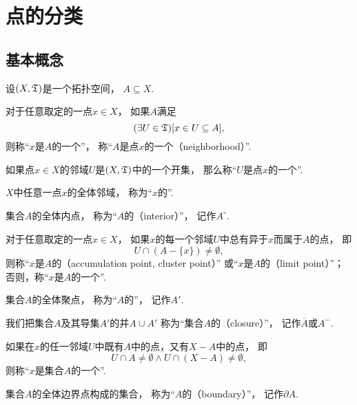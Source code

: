 \section{点的分类}
\subsection{基本概念}
\begin{definition}\label{definition:拓扑学.点的分类}
设\((X,\mathfrak T)\)是一个拓扑空间，
\(A \subseteq X\).

对于任意取定的一点\(x \in X\)，
如果\(A\)满足\[
	(\exists U\in\mathfrak T)
	[x \in U \subseteq A],
\]
则称“\(x\)是\(A\)的一个”，
称“\(A\)是点\(x\)的一个（neighborhood）”.

如果点\(x \in X\)的邻域\(U\)是\((X,\mathfrak T)\)中的一个开集，
那么称“\(U\)是点\(x\)的一个”.

\(X\)中任意一点\(x\)的全体邻域，
称为“\(x\)的”.

集合\(A\)的全体内点，
称为“\(A\)的（interior）”，
记作\(A^\circ\).

对于任意取定的一点\(x \in X\)，
如果\(x\)的每一个邻域\(U\)中总有异于\(x\)而属于\(A\)的点，
即\[
	U \cap (A - \{x\}) \neq \emptyset,
\]
则称“\(x\)是\(A\)的（accumulation point, cluster point）”
或“\(x\)是\(A\)的（limit point）”；
否则，称“\(x\)是\(A\)的一个”.

集合\(A\)的全体聚点，
称为“\(A\)的”，
记作\(A'\).

我们把集合\(A\)及其导集\(A'\)的并\(A \cup A'\)
称为“集合\(A\)的（closure）”，
记作\(\overline{A}\)或\(A^-\).

如果在\(x\)的任一邻域\(U\)中既有\(A\)中的点，又有\(X - A\)中的点，
即\[
	U \cap A \neq \emptyset
	\land
	U \cap (X-A) \neq \emptyset,
\]
则称“\(x\)是集合\(A\)的一个”.

集合\(A\)的全体边界点构成的集合，
称为“\(A\)的（boundary）”，
记作\(\partial A\).
\end{definition}

